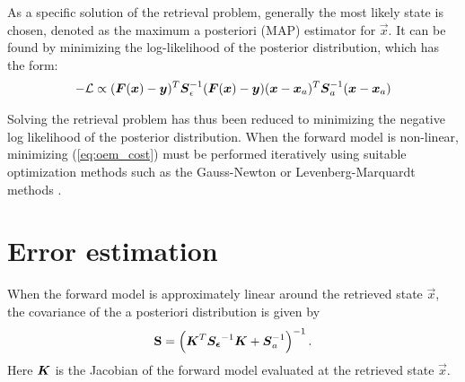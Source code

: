 As a specific solution of the retrieval problem, generally the most likely state is chosen,
denoted as the maximum a posteriori (MAP) estimator for $\vec{x}$. It can be found by minimizing
the log-likelihood of the posterior distribution, which has the form:
\begin{align}\label{eq:oem_cost}
  -\mathcal{L} \propto (\boldsymbol{F}(\boldsymbol{x}) - \boldsymbol{y})^T\boldsymbol{S}_\epsilon^{-1}(\boldsymbol{F}(\boldsymbol{x}) - \boldsymbol{y})
  (\boldsymbol{x} - \boldsymbol{x}_a)^T \boldsymbol{S}_a^{-1} (\boldsymbol{x} - \boldsymbol{x}_a)
\end{align}

Solving the retrieval problem has thus been reduced to minimizing the negative log
likelihood of the posterior distribution. When the forward model is non-linear, minimizing
(\ref{eq:oem_cost}) must be performed iteratively using suitable optimization methods such
as the Gauss-Newton or Levenberg-Marquardt methods \cite{boyd04}.

\section{Error estimation}

When the forward model is approximately linear around the retrieved state $\vec{x}$, the covariance
of the a posteriori distribution is given by
\begin{align}
  \mathbf{S} = \left (\boldsymbol{K}^T \boldsymbol{S_\epsilon}^{-1} \boldsymbol{K} + \boldsymbol{S}_a^{-1} \right)^{-1}.
\end{align}
Here $\boldsymbol{K}$ is the Jacobian of the forward model evaluated at the retrieved state $\vec{x}$.

